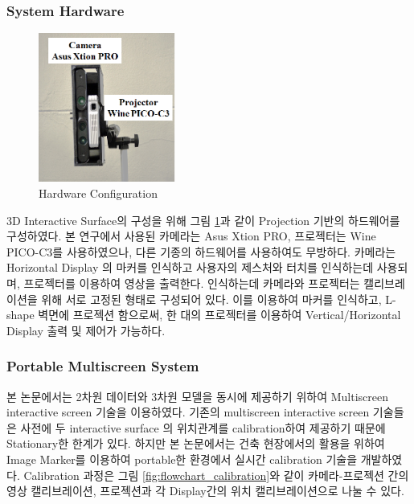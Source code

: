 \subsubsection{System Hardware}
\begin{figure}[ht!]
	\centering
    \includegraphics[width=0.4\textwidth]{3-System/hardware}
	\caption{Hardware Configuration}
    \label{fig:hardware}
\end{figure}
3D Interactive Surface의 구성을 위해 그림 \ref{fig:hardware}과 같이 Projection 기반의 하드웨어를 구성하였다. 본 연구에서 사용된 카메라는 Asus Xtion PRO, 프로젝터는 Wine PICO-C3를 사용하였으나, 다른 기종의 하드웨어를 사용하여도 무방하다. 카메라는 Horizontal Display 의 마커를 인식하고 사용자의 제스처와 터치를 인식하는데 사용되며, 프로젝터를 이용하여 영상을 출력한다. 인식하는데 카메라와 프로젝터는 캘리브레이션을 위해 서로 고정된 형태로 구성되어 있다. 이를 이용하여 마커를 인식하고, L-shape 벽면에 프로젝션 함으로써, 한 대의 프로젝터를 이용하여 Vertical/Horizontal Display 출력 및 제어가 가능하다.

\subsubsection{Portable Multiscreen System}
본 논문에서는 2차원 데이터와 3차원 모델을 동시에 제공하기 위하여 Multiscreen interactive screen 기술을 이용하였다. 기존의 multiscreen interactive screen 기술들은 사전에 두 interactive surface 의 위치관계를 calibration하여 제공하기 때문에 Stationary한 한계가 있다. 하지만 본 논문에서는 건축 현장에서의 활용을 위하여 Image Marker를 이용하여 portable한 환경에서 실시간 calibration 기술을 개발하였다. Calibration 과정은 그림 \ref{fig:flowchart_calibration}와 같이 카메라-프로젝션 간의 영상 캘리브레이션, 프로젝션과 각 Display간의 위치 캘리브레이션으로 나눌 수 있다. 

